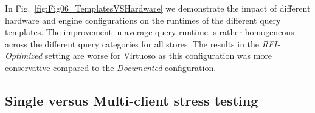 \documentclass[twocolumn]{bmcart}%
\newcommand\todo[1]{\textcolor{red}{#1}}
\begin{document}

In Fig.~\ref{fig:Fig06_TemplatesVSHardware} we demonstrate the impact of different hardware and engine configurations on the runtimes of the different query templates. The improvement in average query runtime is rather homogeneous across the different query categories for all stores. The results in the \emph{RFI-Optimized} setting are worse for Virtuoso as this configuration was more conservative compared to the \emph{Documented} configuration.


\subsection{Single versus Multi-client stress testing}
\label{subsec:load}
%
\end{document}
